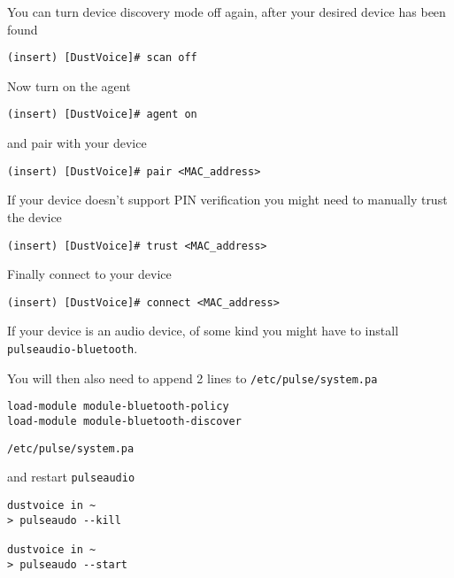 \documentclass[10pt]{dustdoc}
\begin{document}
\begin{NOTE}
    You can turn device discovery mode off again, after your desired device has been found

    \begin{verbatim}
(insert) [DustVoice]# scan off
    \end{verbatim}
\end{NOTE}

Now turn on the agent

\begin{verbatim}
(insert) [DustVoice]# agent on
\end{verbatim}

\noindent
and pair with your device

\begin{verbatim}
(insert) [DustVoice]# pair <MAC_address>
\end{verbatim}

\begin{NOTE}
    If your device doesn’t support PIN verification you might need to manually trust the device

    \begin{verbatim}
(insert) [DustVoice]# trust <MAC_address>
    \end{verbatim}
\end{NOTE}

Finally connect to your device

\begin{verbatim}
(insert) [DustVoice]# connect <MAC_address>
\end{verbatim}

\begin{NOTE}
    If your device is an audio device, of some kind you might have to install \texttt{pulseaudio-bluetooth}.

    You will then also need to append 2 lines to \texttt{/etc/pulse/system.pa}

    \begin{mintedlisting}
        \begin{verbatim}
load-module module-bluetooth-policy
load-module module-bluetooth-discover
        \end{verbatim}

        \caption{\texttt{/etc/pulse/system.pa}}
    \end{mintedlisting}

    \noindent
    and restart \texttt{pulseaudio}

    \begin{verbatim}
dustvoice in ~
> pulseaudo --kill

dustvoice in ~
> pulseaudo --start
    \end{verbatim}

\end{NOTE}
\end{document}
